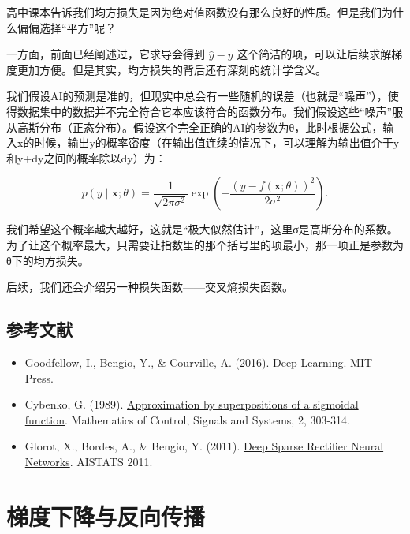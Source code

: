 高中课本告诉我们均方损失是因为绝对值函数没有那么良好的性质。但是我们为什么偏偏选择``平方''呢？

一方面，前面已经阐述过，它求导会得到 \(\hat{y}-y\) 这个简洁的项，可以让后续求解梯度更加方便。但是其实，均方损失的背后还有深刻的统计学含义。

我们假设AI的预测是准的，但现实中总会有一些随机的误差（也就是``噪声''），使得数据集中的数据并不完全符合它本应该符合的函数分布。我们假设这些``噪声''服从高斯分布（正态分布）。假设这个完全正确的AI的参数为θ，此时根据公式，输入x的时候，输出y的概率密度（在输出值连续的情况下，可以理解为输出值介于y和y+dy之间的概率除以dy）为：

\[
p(y \mid \mathbf{x};\theta)=\frac{1}{\sqrt{2\pi\sigma^2}}\exp\left(-\frac{(y-f(\mathbf{x};\theta))^2}{2\sigma^2}\right).
\]

我们希望这个概率越大越好，这就是``极大似然估计''，这里σ是高斯分布的系数。为了让这个概率最大，只需要让指数里的那个括号里的项最小，那一项正是参数为θ下的均方损失。

后续，我们还会介绍另一种损失函数------交叉熵损失函数。

\hypertarget{ux53c2ux8003ux6587ux732e-1}{%
\subsection{参考文献}\label{ux53c2ux8003ux6587ux732e-1}}

\vspace{0.25em}
\begin{itemize}
\tightlist
\item
  Goodfellow, I., Bengio, Y., \& Courville, A. (2016). \href{https://www.deeplearningbook.org/}{Deep Learning}. MIT Press.
\item
  Cybenko, G. (1989). \href{https://doi.org/10.1007/BF02551274}{Approximation by superpositions of a sigmoidal function}. Mathematics of Control, Signals and Systems, 2, 303-314.
\item
  Glorot, X., Bordes, A., \& Bengio, Y. (2011). \href{https://proceedings.mlr.press/v15/glorot11a.html}{Deep Sparse Rectifier Neural Networks}. AISTATS 2011.
\end{itemize}

\clearpage

\hypertarget{ux68afux5ea6ux4e0bux964dux4e0eux53cdux5411ux4f20ux64ad}{%
\section{梯度下降与反向传播}\label{ux68afux5ea6ux4e0bux964dux4e0eux53cdux5411ux4f20ux64ad}}

